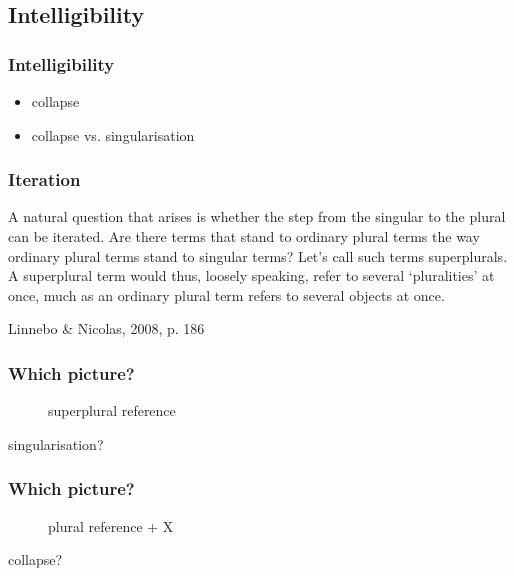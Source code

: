 \documentclass[serif]{beamer}
\renewenvironment{quote}
  {\begin{trivlist} \setlength\leftskip{0cm} \setlength\rightskip{0pt}
   \item\relax}
  {\end{trivlist}}
\begin{document}
\subsection{Intelligibility}

\begin{frame}
\frametitle{Intelligibility}

\begin{itemize}[<+->]
  \item collapse 
  \item collapse vs. singularisation 
\end{itemize}
\end{frame}

\begin{frame}
\frametitle{Iteration}
\begin{quote}
   A natural question that arises is whether the step from the singular to the plural can be iterated. Are there terms that stand to ordinary plural terms the way ordinary plural terms stand to singular terms? Let's call such terms superplurals. A superplural term would thus, loosely speaking, refer to several `pluralities' at once, much as an ordinary plural term refers to several objects at once.
\end{quote}
{\raggedleft\footnotesize Linnebo \& Nicolas, 2008, p. 186 \par}
\end{frame}

\begin{frame}
\frametitle{Which picture?}

\begin{figure}[ht]
\centering
{
}
\caption{superplural reference\label{fig:cover}}
\end{figure}
\pause
\alert{singularisation?}
\end{frame}

\begin{frame}
\frametitle{Which picture?}

\begin{figure}[hp]
\centering
{
}
\caption{plural reference + X\label{fig:art}}
\end{figure}
\pause
\alert{collapse?}
\end{frame}
\end{document}
